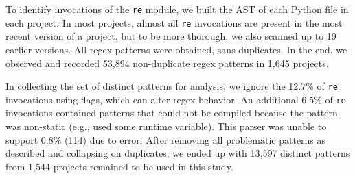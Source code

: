 To identify invocations of the {\tt re} module, we built
the AST of each Python file in each project. In most projects, almost all {\tt re} invocations are present in the
most recent version of a project, but to be more thorough, we also scanned up
to 19 earlier versions. 
All regex patterns were obtained, sans duplicates. 
In the end, we observed and recorded 53,894 non-duplicate regex patterns in 1,645 projects. 

In collecting the set of distinct patterns for analysis,  we ignore the 12.7\%  of {\tt re} invocations using flags, which can alter regex behavior.  An additional 6.5\% of {\tt re} invocations contained patterns that could not be compiled because the pattern was non-static (e.g., used some runtime variable).
This parser was unable to support 0.8\% (114) due to error. 
After removing all problematic patterns as described and collapsing on duplicates, we ended up with 13,597 distinct patterns from 1,544 projects remained to be used in this study.



